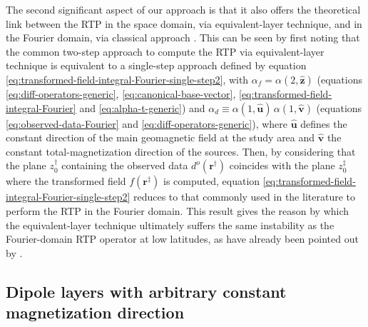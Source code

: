 The second significant aspect of our approach is that it also offers 
the theoretical link between the RTP in the space domain, via equivalent-layer technique, and 
in the Fourier domain, via classical approach \citep[e.g., ][ p. 331]{blakely1996}. 
This can be seen by first noting that the common two-step approach to compute the RTP via equivalent-layer technique is 
equivalent to a single-step approach defined by equation
\ref{eq:transformed-field-integral-Fourier-single-step2}, with $\alpha_{f} = \alpha(2, \hat{\mathbf{z}})$ 
(equations \ref{eq:diff-operators-generic}, \ref{eq:canonical-base-vector}, 
\ref{eq:transformed-field-integral-Fourier} and \ref{eq:alpha-t-generic}) and 
$\alpha_{d} \equiv \alpha(1, \hat{\mathbf{u}}) \, \alpha(1, \hat{\mathbf{v}})$ (equations \ref{eq:observed-data-Fourier} and 
\ref{eq:diff-operators-generic}), 
where $\hat{\mathbf{u}}$ defines the constant direction of the main geomagnetic
field at the study area and $\hat{\mathbf{v}}$ the constant total-magnetization direction of the sources.
Then, by considering that the plane $z^{\dagger}_{0}$ containing the observed data $d^{o}(\mathbf{r}^{\dagger})$ coincides with the 
plane $z^{\ddagger}_{0}$ where the transformed field $f(\mathbf{r}^{\ddagger})$ is computed, equation \ref{eq:transformed-field-integral-Fourier-single-step2} 
reduces to that commonly used in the literature \citep[e.g., ][ p. 331]{blakely1996} to perform the RTP in the 
Fourier domain.
This result gives the reason by which the equivalent-layer technique ultimately suffers the same instability as 
the Fourier-domain RTP operator at low latitudes, as have already been pointed out by \citet{li_etal2014}.


\subsection{Dipole layers with arbitrary constant magnetization direction}


